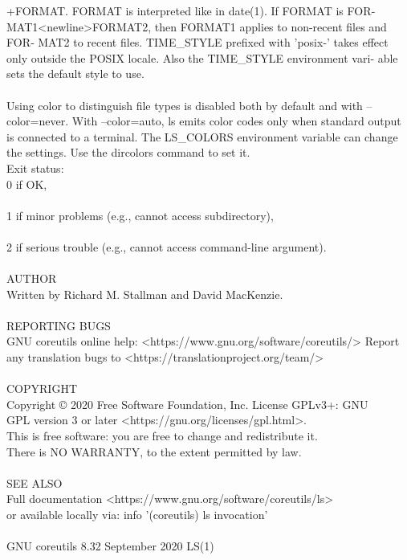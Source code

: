 \documentclass{article}
\begin{document}
\tabto{1cm}       +FORMAT.   FORMAT  is  interpreted  like in date(1).  If FORMAT is FOR‐
\tabto{1cm}       MAT1<newline>FORMAT2, then FORMAT1 applies to non-recent files and FOR‐
\tabto{1cm}       MAT2  to  recent files.  TIME_STYLE prefixed with 'posix-' takes effect
\tabto{1cm}       only outside the POSIX locale.  Also the TIME_STYLE  environment  vari‐
\tabto{1cm}       able sets the default style to use. \\
\\
\tabto{1cm}       Using  color  to distinguish file types is disabled both by default and
\tabto{1cm}       with --color=never.  With --color=auto, ls emits color codes only  when
\tabto{1cm}       standard  output is connected to a terminal.  The LS_COLORS environment
\tabto{1cm}       variable can change the settings.  Use the dircolors command to set it.
\\
   Exit status: \\
\tabto{1cm}       0      if OK, \\
\\
\tabto{1cm}       1      if minor problems (e.g., cannot access subdirectory), \\
\\
\tabto{1cm}       2      if serious trouble (e.g., cannot access command-line argument). \\
\\
AUTHOR \\
\tabto{1cm}       Written by Richard M. Stallman and David MacKenzie. \\
\\
REPORTING BUGS \\
\tabto{1cm}       GNU coreutils online help: <https://www.gnu.org/software/coreutils/>
\tabto{1cm}       Report any translation bugs to <https://translationproject.org/team/> \\
\\
COPYRIGHT \\
\tabto{1cm}       Copyright © 2020 Free Software Foundation, Inc.   License  GPLv3+:  GNU \\
\tabto{1cm}       GPL version 3 or later <https://gnu.org/licenses/gpl.html>. \\
\tabto{1cm}       This  is  free  software:  you  are free to change and redistribute it. \\
\tabto{1cm}       There is NO WARRANTY, to the extent permitted by law. \\
\\
SEE ALSO \\
\tabto{1cm}       Full documentation <https://www.gnu.org/software/coreutils/ls> \\
\tabto{1cm}       or available locally via: info '(coreutils) ls invocation' \\
\\
GNU coreutils 8.32              September 2020                           LS(1) \\
\end{document}
